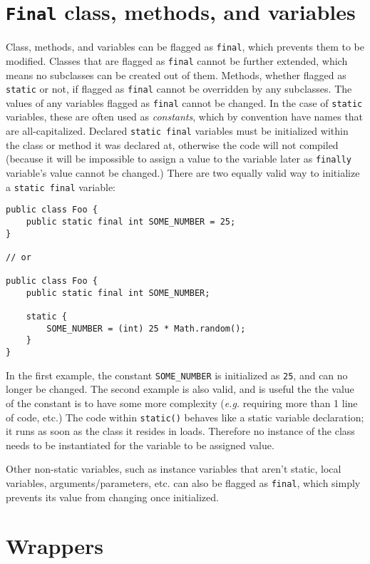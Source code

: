 \documentclass{tufte-handout}
\begin{document}
    \section*{\texttt{Final} class, methods, and variables}
    Class, methods, and variables can be flagged as \texttt{final}, which prevents them to be modified. Classes that are flagged as \texttt{final} cannot be further extended, which means no subclasses can be created out of them. Methods, whether flagged as \texttt{static} or not, if flagged as \texttt{final} cannot be overridden by any subclasses. The values of any variables flagged as \texttt{final} cannot be changed. In the case of \texttt{static} variables, these are often used as \emph{constants}, which by convention have names that are all-capitalized. Declared \texttt{static final} variables must be initialized within the class or method it was declared at, otherwise the code will not compiled (because it will be impossible to assign a value to the variable later as \texttt{finally} variable's value cannot be changed.) There are two equally valid way to initialize a \texttt{static final} variable:

    \begin{lstlisting}
public class Foo {
    public static final int SOME_NUMBER = 25;
}

// or

public class Foo {
    public static final int SOME_NUMBER;

    static {
        SOME_NUMBER = (int) 25 * Math.random();
    }
}
    \end{lstlisting}

    In the first example, the constant \texttt{SOME\_NUMBER} is initialized as \texttt{25}, and can no longer be changed. The second example is also valid, and is useful the the value of the constant is to have some more complexity (\textit{e.g.} requiring more than 1 line of code, etc.) The code within \texttt{static()} behaves like a static variable declaration; it runs as soon as the class it resides in loads. Therefore no instance of the class needs to be instantiated for the variable to be assigned value. 

    Other non-static variables, such as instance variables that aren't static, local variables, arguments/parameters, etc. can also be flagged as \texttt{final}, which simply prevents its value from changing once initialized. 

    \section*{Wrappers}
\end{document}
